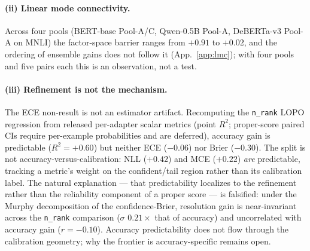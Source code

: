 \documentclass[11pt]{article}
\begin{document}
\paragraph{(ii) Linear mode connectivity.} Across four pools (BERT-base Pool-A/C, Qwen-0.5B Pool-A, DeBERTa-v3 Pool-A on MNLI) the factor-space barrier ranges from $+0.91$ to $+0.02$, and the ordering of ensemble gains does not follow it (App.~\ref{app:lmc}); with four pools and five pairs each this is an observation, not a test.

\paragraph{(iii) Refinement is not the mechanism.} The ECE non-result is not an estimator artifact. Recomputing the \texttt{n\_rank} LOPO regression from released per-adapter scalar metrics (point $R^2$; proper-score paired CIs require per-example probabilities and are deferred), accuracy gain is predictable ($R^2{=}{+}0.60$) but neither ECE ($-0.06$) nor Brier ($-0.30$). The split is not accuracy-versus-calibration: NLL ($+0.42$) and MCE ($+0.22$) \emph{are} predictable, tracking a metric's weight on the confident/tail region rather than its calibration label. The natural explanation --- that predictability localizes to the refinement rather than the reliability component of a proper score --- is falsified: under the Murphy decomposition of the confidence-Brier, resolution gain is near-invariant across the \texttt{n\_rank} comparison ($\sigma$ $0.21{\times}$ that of accuracy) and uncorrelated with accuracy gain ($r{=}{-}0.10$). Accuracy predictability does not flow through the calibration geometry; why the frontier is accuracy-specific remains open.
\end{document}
